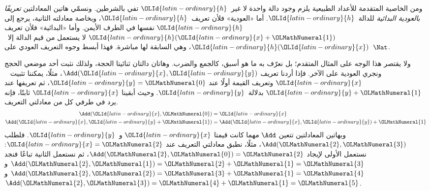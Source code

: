 \documentclass[../../../include/open-logic-section]{subfiles}
\begin{document}
ومن الخاصية المتقدمة للأعداد الطبيعية يلزم وجود دالة واحدة لا غير~${\OLId{latin-ordinary}{h}}$ تفي
بالشرطين. ونسمّي هاتين المعادلتين \emph{تعريفًا بالعودية
البدائية} للدالة~${\OLId{latin-ordinary}{h}}$. أما «العودية» فلأن تعريف~${\OLId{latin-ordinary}{h}}$، وبخاصة معادلته
الثانية، يرجع إلى ${\OLId{latin-ordinary}{h}}$ نفسها في الطرف الأيمن. وأما «البدائية» فلأن
تعريف ${\OLId{latin-ordinary}{h}}({\OLId{latin-ordinary}{x}}+{\OLMathNumeral{1}})$ لا يستعمل من قيم الدالة إلا~${\OLId{latin-ordinary}{h}}({\OLId{latin-ordinary}{x}})$، وهي السابقة لها مباشرة.
فهذا أبسط وجوه التعريف العودي على~$\Nat$.

ولا يقتصر هذا الوجه على المثال المتقدم؛ بل نعرّف به ما هو أسبق، كالجمع والضرب.
وهاتان دالتان ثنائيتا الحجة، ولذلك نثبت أحد موضعي
الحجج ونجري العودية على الآخر. فإذا أردنا تعريف $\Add({\OLId{latin-ordinary}{x}},{\OLId{latin-ordinary}{y}})$، مثلًا، يمكننا تثبيت
~${\OLId{latin-ordinary}{x}}$ وتعريف القيمة أولًا عند ${\OLId{latin-ordinary}{y}}={\OLMathNumeral{0}}$، ثم تعريفها عند ${\OLId{latin-ordinary}{y}}+{\OLMathNumeral{1}}$ بدلالة~${\OLId{latin-ordinary}{y}}$.
وحيث أبقينا ${\OLId{latin-ordinary}{x}}$ ثابتًا، فإنه يرد في طرفي كل من معادلتي التعريف.
\begin{align*}
\Add({\OLId{latin-ordinary}{x}},{\OLMathNumeral{0}}) & =  {\OLId{latin-ordinary}{x}}\\
\Add({\OLId{latin-ordinary}{x}},{\OLId{latin-ordinary}{y}}+{\OLMathNumeral{1}}) & =  \Add({\OLId{latin-ordinary}{x}},{\OLId{latin-ordinary}{y}})+{\OLMathNumeral{1}}
\end{align*}
وبهاتين المعادلتين تتعين $\Add$ مهما كانت قيمتا ${\OLId{latin-ordinary}{x}}$ و~${\OLId{latin-ordinary}{y}}$. فلطلب
$\Add({\OLMathNumeral{2}},{\OLMathNumeral{3}})$، مثلًا، نطبق معادلتي التعريف عند ${\OLId{latin-ordinary}{x}}={\OLMathNumeral{2}}$: نستعمل الأولى
لإيجاد $\Add({\OLMathNumeral{2}},{\OLMathNumeral{0}})={\OLMathNumeral{2}}$، ثم نستعمل الثانية تباعًا فنجد
$\Add({\OLMathNumeral{2}},{\OLMathNumeral{1}})={\OLMathNumeral{2}}+{\OLMathNumeral{1}}={\OLMathNumeral{3}}$ و$\Add({\OLMathNumeral{2}},{\OLMathNumeral{2}})={\OLMathNumeral{3}}+{\OLMathNumeral{1}}={\OLMathNumeral{4}}$ و$\Add({\OLMathNumeral{2}},{\OLMathNumeral{3}})={\OLMathNumeral{4}}+{\OLMathNumeral{1}}={\OLMathNumeral{5}}$.
\end{document}
